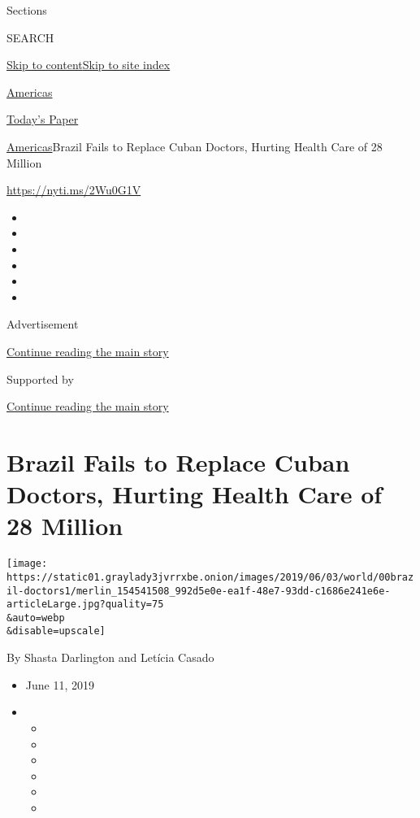 Sections

SEARCH

\protect\hyperlink{site-content}{Skip to
content}\protect\hyperlink{site-index}{Skip to site index}

\href{https://www.nytimes3xbfgragh.onion/section/world/americas}{Americas}

\href{https://myaccount.nytimes3xbfgragh.onion/auth/login?response_type=cookie\&client_id=vi}{}

\href{https://www.nytimes3xbfgragh.onion/section/todayspaper}{Today's
Paper}

\href{/section/world/americas}{Americas}\textbar{}Brazil Fails to
Replace Cuban Doctors, Hurting Health Care of 28 Million

\url{https://nyti.ms/2Wu0G1V}

\begin{itemize}
\item
\item
\item
\item
\item
\item
\end{itemize}

Advertisement

\protect\hyperlink{after-top}{Continue reading the main story}

Supported by

\protect\hyperlink{after-sponsor}{Continue reading the main story}

\hypertarget{brazil-fails-to-replace-cuban-doctors-hurting-health-care-of-28-million}{%
\section{Brazil Fails to Replace Cuban Doctors, Hurting Health Care of
28
Million}\label{brazil-fails-to-replace-cuban-doctors-hurting-health-care-of-28-million}}

\texttt{[image: https://static01.graylady3jvrrxbe.onion/images/2019/06/03/world/00brazil-doctors1/merlin\_154541508\_992d5e0e-ea1f-48e7-93dd-c1686e241e6e-articleLarge.jpg?quality=75\\\&auto=webp\\\&disable=upscale]}

By Shasta Darlington and Letícia Casado

\begin{itemize}
\item
  June 11, 2019
\item
  \begin{itemize}
  \item
  \item
  \item
  \item
  \item
  \item
  \end{itemize}
\end{itemize}

